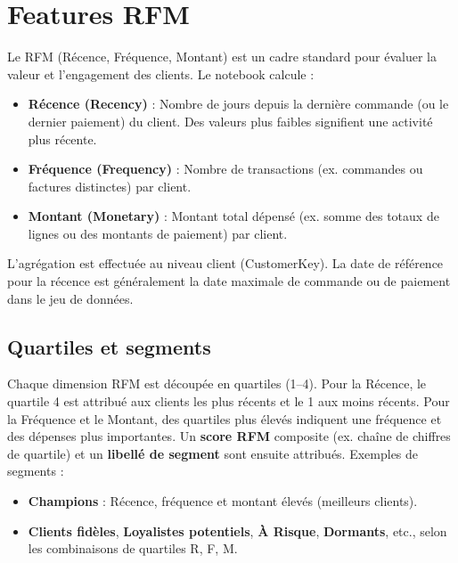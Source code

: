 \documentclass[11pt,a4paper]{article}
\begin{document}
\section{Features RFM}

Le RFM (Récence, Fréquence, Montant) est un cadre standard pour évaluer la valeur et l'engagement des clients. Le notebook calcule :

\begin{itemize}[noitemsep]
  \item \textbf{Récence (Recency)} : Nombre de jours depuis la dernière commande (ou le dernier paiement) du client. Des valeurs plus faibles signifient une activité plus récente.
  \item \textbf{Fréquence (Frequency)} : Nombre de transactions (ex. commandes ou factures distinctes) par client.
  \item \textbf{Montant (Monetary)} : Montant total dépensé (ex. somme des totaux de lignes ou des montants de paiement) par client.
\end{itemize}

L'agrégation est effectuée au niveau client (CustomerKey). La date de référence pour la récence est généralement la date maximale de commande ou de paiement dans le jeu de données.

\subsection{Quartiles et segments}

Chaque dimension RFM est découpée en quartiles (1--4). Pour la Récence, le quartile 4 est attribué aux clients les plus récents et le 1 aux moins récents. Pour la Fréquence et le Montant, des quartiles plus élevés indiquent une fréquence et des dépenses plus importantes. Un \textbf{score RFM} composite (ex. chaîne de chiffres de quartile) et un \textbf{libellé de segment} sont ensuite attribués. Exemples de segments :
\begin{itemize}[noitemsep]
  \item \textbf{Champions} : Récence, fréquence et montant élevés (meilleurs clients).
  \item \textbf{Clients fidèles}, \textbf{Loyalistes potentiels}, \textbf{À Risque}, \textbf{Dormants}, etc., selon les combinaisons de quartiles R, F, M.
\end{itemize}
\end{document}
